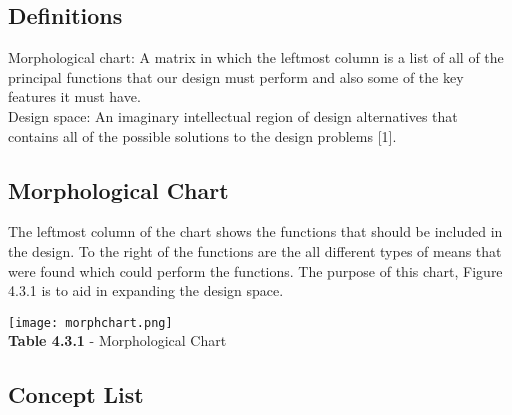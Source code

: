 \documentclass{article}
\begin{document}
\subsection{Definitions}
Morphological chart: A matrix in which the leftmost column is a list of all of the principal functions that our design must perform and also some of the key features it must have. \\
Design space: An imaginary intellectual region of design alternatives that contains all of the possible solutions to the design problems [1].

\subsection{Morphological Chart}
The leftmost column of the chart shows the functions that should be included in the design. To the right of the functions are the all different types of means that were found which could perform the functions. The purpose of this chart, Figure 4.3.1 is to aid in expanding the design space.

\begin{center}
    \texttt{[image: morphchart.png]}\\
    \small{\textbf{Table 4.3.1} - Morphological Chart}
\end{center}

\subsection{Concept List}
\end{document}
